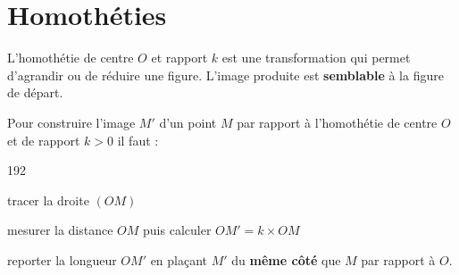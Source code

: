 \documentclass[main.tex]{subfiles}
\begin{document}
\section{Homothéties}
L’homothétie de centre $O$ et rapport $k$ est une transformation qui permet d’agrandir ou de réduire une figure. L’image produite est \textbf{semblable} à la figure de départ. 
\begin{cBox}[frametitle={cas rapport positif : $k>0$}]
Pour construire l'image $M'$ d'un point $M$ par rapport à l'homothétie de centre $O$ et de rapport $k>0$ il faut :
\begin{dingautolist}{192}
	\item tracer la droite $(OM)$
	\item mesurer la distance $OM$ puis calculer $OM'=k\times OM$
	\item reporter la longueur $OM'$ en plaçant $M'$ du \textbf{même côté}  que $M$ par rapport à $O$.
\end{dingautolist} 
\end{cBox}
\end{document}
